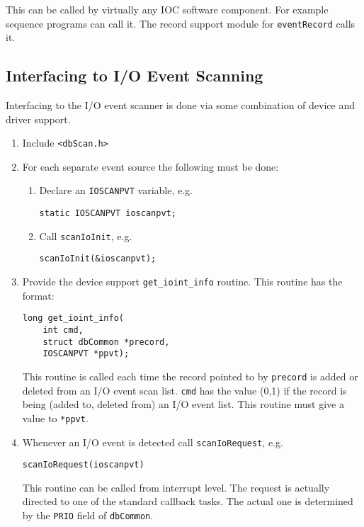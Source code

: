 This can be called by virtually any IOC software component.
For example sequence programs can call it.
The record support module for \verb|eventRecord| calls it.

\subsection{Interfacing to I/O Event Scanning}


Interfacing to the I/O event scanner is done via some combination of device and driver support.

\begin{enumerate}
\item Include \verb|<dbScan.h>|

\item For each separate event source the following must be done:

\begin{enumerate}

\item Declare an \verb|IOSCANPVT| variable, e.g.

\begin{verbatim}
static IOSCANPVT ioscanpvt;
\end{verbatim}

\item Call \verb|scanIoInit|, e.g.

\begin{verbatim}
scanIoInit(&ioscanpvt);
\end{verbatim}
\end{enumerate}

\item Provide the device support \verb|get_ioint_info| routine.
This routine has the format:

\begin{verbatim}
long get_ioint_info(
    int cmd,
    struct dbCommon *precord,
    IOSCANPVT *ppvt);
\end{verbatim}

This routine is called each time the record pointed to by \verb|precord| is added or deleted from an I/O event scan list.
\verb|cmd| has the value (0,1) if the record is being (added to, deleted from) an I/O event list.
This routine must give a value to \verb|*ppvt|.

\item Whenever an I/O event is detected call \verb|scanIoRequest|, e.g.

\begin{verbatim}
scanIoRequest(ioscanpvt)
\end{verbatim}

This routine can be called from interrupt level.
The request is actually directed to one of the standard callback tasks.
The actual one is determined by the \verb|PRIO| field of \verb|dbCommon|.

\end{enumerate}

